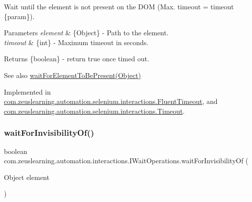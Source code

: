 Wait until the element is not present on the D\+OM (Max. timeout = timeout \{param\}).


\begin{DoxyParams}{Parameters}
{\em element} & \{Object\} -\/ Path to the element. \\
\hline
{\em timeout} & \{int\} -\/ Maximum timeout in seconds.\\
\hline
\end{DoxyParams}
\begin{DoxyReturn}{Returns}
\{boolean\} -\/ return {\ttfamily true} once timed out.
\end{DoxyReturn}
\begin{DoxySeeAlso}{See also}
\hyperlink{interfacecom_1_1zeuslearning_1_1automation_1_1interactions_1_1IWaitOperations_a37e642af4e56132b564fa67e34e973d4}{wait\+For\+Element\+To\+Be\+Present(\+Object)} 
\end{DoxySeeAlso}


Implemented in \hyperlink{classcom_1_1zeuslearning_1_1automation_1_1selenium_1_1interactions_1_1FluentTimeout_afce3a66e8c4bab59f37be96fd45eeec3}{com.\+zeuslearning.\+automation.\+selenium.\+interactions.\+Fluent\+Timeout}, and \hyperlink{classcom_1_1zeuslearning_1_1automation_1_1selenium_1_1interactions_1_1Timeout_a42bc49d29d2f69d50650ec4c9d80eec2}{com.\+zeuslearning.\+automation.\+selenium.\+interactions.\+Timeout}.

\hypertarget{interfacecom_1_1zeuslearning_1_1automation_1_1interactions_1_1IWaitOperations_a92e178778c5219ee00b59f5d8cdc8f94}{}\label{interfacecom_1_1zeuslearning_1_1automation_1_1interactions_1_1IWaitOperations_a92e178778c5219ee00b59f5d8cdc8f94} 
\subsubsection{\texorpdfstring{wait\+For\+Invisibility\+Of()}{waitForInvisibilityOf()}\hspace{0.1cm}{\footnotesize\ttfamily [1/2]}}
{\footnotesize\ttfamily boolean com.\+zeuslearning.\+automation.\+interactions.\+I\+Wait\+Operations.\+wait\+For\+Invisibility\+Of (\begin{DoxyParamCaption}\item[{Object}]{element }\end{DoxyParamCaption})}

